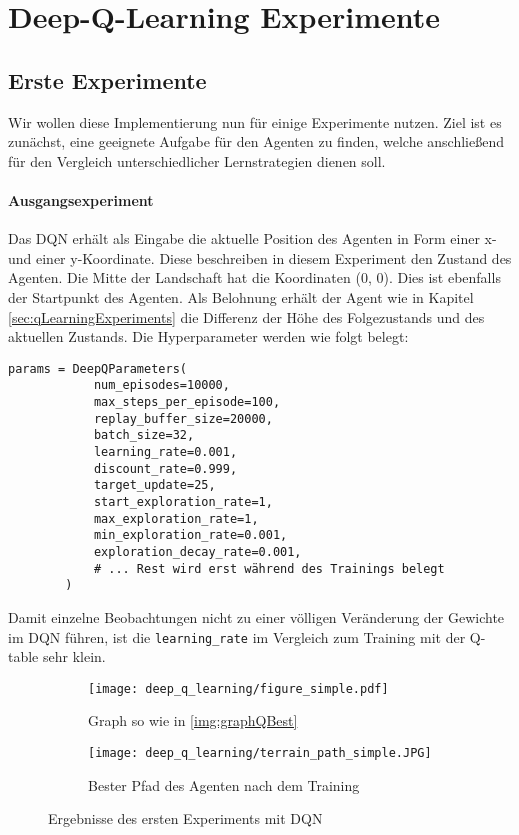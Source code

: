 \section{Deep-Q-Learning Experimente}

\subsection{Erste Experimente} \label{sec:deepQFirstExperiments}
Wir wollen diese Implementierung nun für einige Experimente nutzen. Ziel ist es zunächst, eine geeignete Aufgabe für den Agenten zu finden, welche anschließend für den Vergleich unterschiedlicher Lernstrategien dienen soll.

\paragraph{Ausgangsexperiment}
Das DQN erhält als Eingabe die aktuelle Position des Agenten in Form einer x- und einer y-Koordinate. Diese beschreiben in diesem Experiment den Zustand des Agenten. Die Mitte der Landschaft hat die Koordinaten (0, 0). Dies ist ebenfalls der Startpunkt des Agenten. Als Belohnung erhält der Agent wie in Kapitel \ref{sec:qLearningExperiments} die Differenz der Höhe des Folgezustands und des aktuellen Zustands. Die Hyperparameter werden wie folgt belegt:
\begin{verbatim}
params = DeepQParameters(
            num_episodes=10000,
            max_steps_per_episode=100,
            replay_buffer_size=20000,
            batch_size=32,
            learning_rate=0.001,
            discount_rate=0.999,
            target_update=25,
            start_exploration_rate=1,
            max_exploration_rate=1,
            min_exploration_rate=0.001,
            exploration_decay_rate=0.001,
            # ... Rest wird erst während des Trainings belegt
        )
\end{verbatim}
Damit einzelne Beobachtungen nicht zu einer völligen Veränderung der Gewichte im DQN führen, ist die \texttt{learning_rate} im Vergleich zum Training mit der Q-table sehr klein.
\begin{figure}[h!]
    \centering
    \begin{subfigure}[b]{0.49\textwidth}
        \texttt{[image: deep\_q\_learning/figure\_simple.pdf]}
        \caption{Graph so wie in \ref{img:graphQBest}}
        \label{img:graphDeepQSimple}
    \end{subfigure}
    \begin{subfigure}[b]{0.49\textwidth}
        \texttt{[image: deep\_q\_learning/terrain\_path\_simple.JPG]}
        \caption{Bester Pfad des Agenten nach dem Training}
        \label{img:pathDeepQSimple}
    \end{subfigure}
    \caption{Ergebnisse des ersten Experiments mit DQN}
\end{figure}
